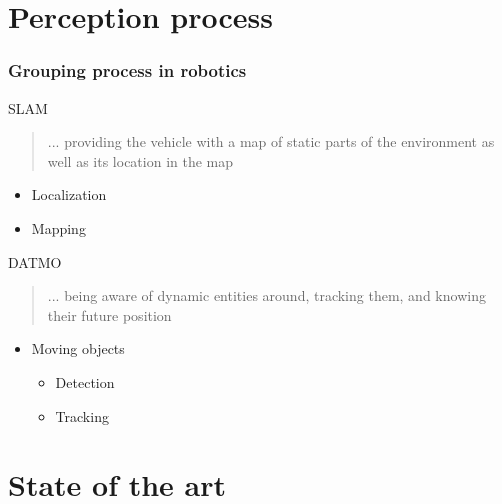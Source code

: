 \documentclass{beamer}
\begin{document}
\section{Perception process}


	\begin{frame}
		\frametitle{Grouping process in robotics}	
		\begin{exampleblock}{SLAM}		
			\begin{quotation}
... providing the vehicle with a map of static parts of the environment as well as its location in the map \cite{DBLP:journals/inffus/VuBA11}
			\end{quotation}
			\begin{itemize}
			\item Localization
			\item Mapping
			\end{itemize}			
		\end{exampleblock}					
				
		\begin{exampleblock}{DATMO}		
			\begin{quotation}
			... being aware of dynamic entities around, tracking them, and knowing their future position \cite{DBLP:journals/inffus/VuBA11}
			\end{quotation}				
			\begin{itemize}
			\item Moving objects
				\begin{itemize}
				\item Detection
				\item Tracking
				\end{itemize}			
			\end{itemize}			
		\end{exampleblock}						
				
	\end{frame}


\section{State of the art}
\end{document}
